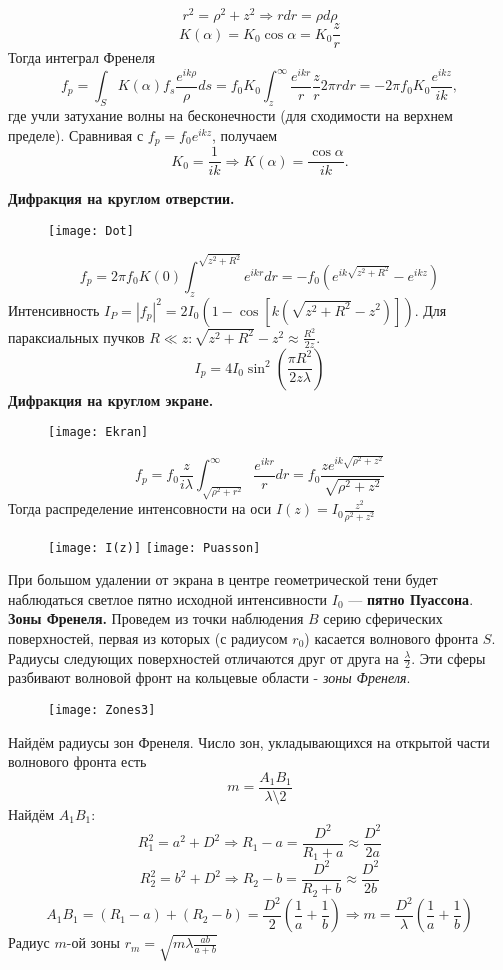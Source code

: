 $$
r^2 = \rho^2 + z^2 \Rightarrow rdr = \rho d\rho
$$
$$
K(\alpha) = K_0 \cos{\alpha} = K_0 \frac {z}{r}
$$
Тогда интеграл Френеля
$$f_p = \int_{S}K(\alpha)f_s\frac{e^{ik\rho}}{\rho}ds = f_0 K_0 \int_{z}^{\infty}\frac{e^{ikr}}{r}\frac{z}{r}2\pi rdr = - 2\pi f_0K_0\frac{e^{ikz}}{ik},$$
где учли затухание волны на бесконечности (для сходимости на верхнем пределе). Сравнивая с $f_p = f_0 e^{ikz}$, получаем $$K_0 = \frac{1}{ik} \Rightarrow K(\alpha)=\frac{\cos{\alpha}}{ik}.$$

\textbf{Дифракция на круглом отверстии.}
\begin{figure}[H]
	\centering
	\texttt{[image: Dot]}
\end{figure}
$$f_p = 2\pi f_0 K(0) \int_{z}^{\sqrt{z^2+R^2}} e^{ikr}dr = - f_0(e^{ik\sqrt{z^2+R^2}}- e^{ikz})$$
Интенсивность $ I_P = |f_p|^2 = 2I_0 (1 - \cos{[k(\sqrt{z^2+R^2}-z^2)]})$. Для параксиальных пучков $R \ll z: \sqrt{z^2+R^2}-z^2 \approx \frac{R^2}{2z}$.
$$I_p = 4I_0\sin^2{(\frac{\pi R^2}{2z\lambda})}$$
$$
$$
\textbf{Дифракция на круглом экране.}
\begin{figure}[H]
	\centering
	\texttt{[image: Ekran]}
\end{figure}

$$f_p = f_0 \frac {z}{i\lambda} \int_{\sqrt{\rho^2 + r^2}}^{\infty}\frac{e^{ikr}}{r}dr = f_0 \frac{ze^{ik\sqrt{\rho^2+z^2}}}{\sqrt{\rho^2+z^2}}$$
Тогда распределение интенсовности на оси $I(z) = I_0 \frac{z^2}{\rho^2+z^2}$
\begin{figure}[H]
	\centering
	\texttt{[image: I(z)]}
	\texttt{[image: Puasson]}
\end{figure}

При большом удалении от экрана в центре геометрической тени будет наблюдаться светлое пятно исходной интенсивности $I_0$ --- \textbf{пятно Пуассона}.
$$
$$
\textbf{Зоны Френеля.} Проведем из точки наблюдения $B$ серию сферических поверхностей, первая из которых (с радиусом $r_0$) касается волнового фронта $S$. Радиусы следующих поверхностей отличаются друг от друга на $\frac{\lambda} {2}$.
Эти сферы разбивают волновой фронт на кольцевые области - \textit{зоны Френеля}.
\begin{figure}[H]
	\centering
	\texttt{[image: Zones3]}
\end{figure}
Найдём радиусы зон Френеля. Число зон, укладывающихся на открытой части волнового фронта есть $$m = \frac{A_1B_1}{\lambda\setminus 2}$$
Найдём $A_1B_1$: $$R_1^2 = a^2 + D^2 \Rightarrow R_1 - a = \frac{D^2}{R_1 + a} \approx \frac{D^2}{2a} $$ 
$$R_2^2 = b^2 + D^2 \Rightarrow R_2 - b = \frac{D^2}{R_2 + b} \approx \frac{D^2}{2b}$$
$$A_1B_1 = (R_1 - a) + (R_2 - b) = \frac{D^2}{2} (\frac 1{a} + \frac 1{b})	\Rightarrow m = \frac{D^2}{\lambda} (\frac 1{a} + \frac 1{b})$$
Радиус $m$-ой зоны $r_m = \sqrt{m\lambda \frac{ab}{a+b}}$
	
